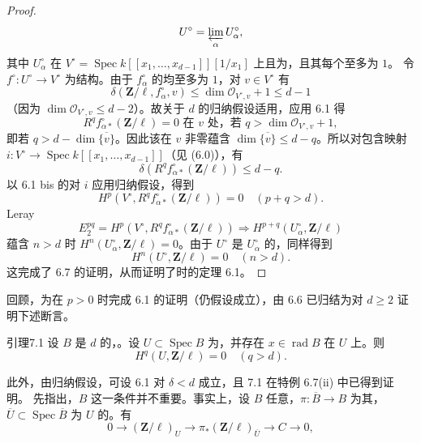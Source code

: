 \begin{proof}
\[U^\circ=\varprojlim_\alpha U^\circ_\alpha,\]
其中 $U^\circ_\alpha$ 在 $V^\circ=\operatorname{Spec}k[[x_1,\ldots,x_{d-1}]][1/x_1]$ 上且为，且其每个至多为 $1$。
令 $f^\circ:U^\circ\to V^\circ$ 为结构。由于 $f^\circ_\alpha$ 的均至多为 $1$，对 $v\in V^\circ$ 有
\[\delta(\mathbf Z/\ell,f^\circ_\alpha,v)\le\dim\mathcal O_{V^\circ,v}+1\le d-1\]
（因为 $\dim\mathcal O_{V^\circ,v}\le d-2$）。故关于 $d$ 的归纳假设适用，应用 6.1 得
\[R^qf^\circ_{\alpha*}(\mathbf Z/\ell)=0\text{ 在 }v\text{ 处，若 }q>\dim\mathcal O_{V^\circ,v}+1,\]
即若 $q>d-\dim\overline{\{v\}}$。因此该在 $v$ 非零蕴含 $\dim\overline{\{v\}}\le d-q$。所以对包含映射 $i:V^\circ\to\operatorname{Spec}k[[x_1,\ldots,x_{d-1}]]$（见 (6.0)），有
\[\delta(R^qf^\circ_{\alpha*}(\mathbf Z/\ell))\le d-q.\]
以 6.1 bis 的对 $i$ 应用归纳假设，得到
\[H^p(V^\circ,R^qf^\circ_{\alpha*}(\mathbf Z/\ell))=0\quad(p+q>d).\]
Leray 
\[E_2^{pq}=H^p(V^\circ,R^qf^\circ_{\alpha*}(\mathbf Z/\ell))\Longrightarrow H^{p+q}(U^\circ_\alpha,\mathbf Z/\ell)\]
蕴含 $n>d$ 时 $H^n(U^\circ_\alpha,\mathbf Z/\ell)=0$。由于 $U^\circ$ 是 $U^\circ_\alpha$ 的，同样得到
\[H^n(U^\circ,\mathbf Z/\ell)=0\quad(n>d).\]
这完成了 6.7 的证明，从而证明了时的定理 6.1。
\end{proof}
回顾，为在 $p>0$ 时完成 6.1 的证明（仍假设成立），由 6.6 已归结为对 $d\ge2$ 证明下述断言。
\begin{SGAresult}{引理}{7.1}
设 $B$ 是 $d$ 的，。设 $U\subset\operatorname{Spec}B$ 为，并存在 $x\in\operatorname{rad}B$ 在 $U$ 上。则
\[H^q(U,\mathbf Z/\ell)=0\quad(q>d).\]
\end{SGAresult}
此外，由归纳假设，可设 6.1 对 $\delta<d$ 成立，且 7.1 在特例 6.7(ii) 中已得到证明。
先指出，$B$ 这一条件并不重要。事实上，设 $B$ 任意，$\pi:\overline B\to B$ 为其，$\overline U\subset\operatorname{Spec}\overline B$ 为 $U$ 的。有
\[0\longrightarrow(\mathbf Z/\ell)_U\longrightarrow\pi_*(\mathbf Z/\ell)_{\overline U}\longrightarrow C\longrightarrow0,\]
